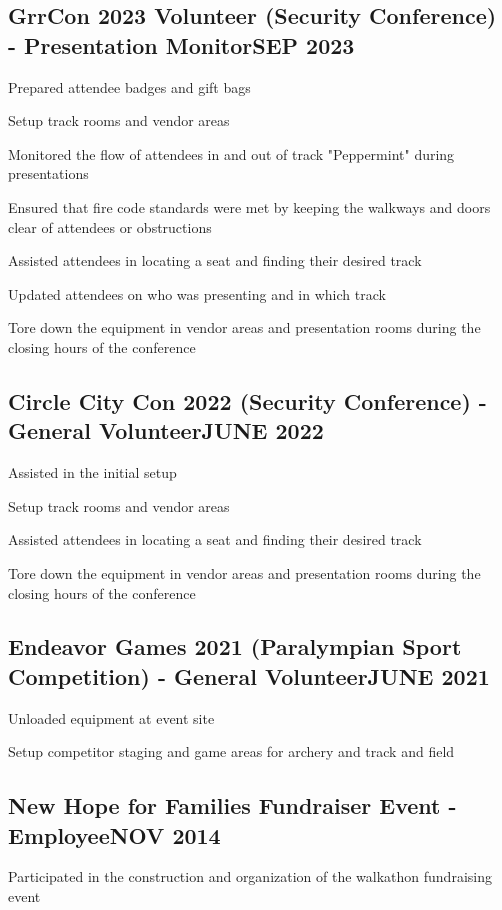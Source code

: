 \documentclass[letter,10pt]{article}
\begin{document}
\subsection{{GrrCon 2023 Volunteer (Security Conference) - Presentation Monitor\hfill SEP 2023}}
\begin{zitemize}
\item Prepared attendee badges and gift bags
\item Setup track rooms and vendor areas
\item Monitored the flow of attendees in and out of track "Peppermint" during presentations
\item Ensured that fire code standards were met by keeping the walkways and doors clear of attendees or obstructions
\item Assisted attendees in locating a seat and finding their desired track
\item Updated attendees on who was presenting and in which track
\item Tore down the equipment in vendor areas and presentation rooms during the closing hours of the conference
\end{zitemize}

\subsection{{Circle City Con 2022 (Security Conference) - General Volunteer\hfill JUNE 2022}}
\begin{zitemize}
\item Assisted in the initial setup
\item Setup track rooms and vendor areas
\item Assisted attendees in locating a seat and finding their desired track
\item Tore down the equipment in vendor areas and presentation rooms during the closing hours of the conference
\end{zitemize}

\subsection{Endeavor Games 2021 (Paralympian Sport Competition) - General Volunteer\hfill JUNE 2021}
\begin{zitemize}
\item Unloaded equipment at event site
\item Setup competitor staging and game areas for archery and track and field
\end{zitemize}

\subsection{New Hope for Families Fundraiser Event - Employee\hfill NOV 2014}
\begin{zitemize}
\item Participated in the construction and organization of the walkathon fundraising event
\end{zitemize}
\end{document}
